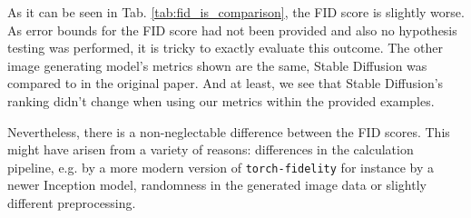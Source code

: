 \documentclass[11pt]{article}
\begin{document}
As it can be seen in Tab. \ref{tab:fid_is_comparison}, the FID score is slightly worse. As error bounds for the FID score had not been provided and also no hypothesis testing was performed, it is tricky to exactly evaluate this outcome. The other image generating model's metrics shown are the same, Stable Diffusion was compared to in the original paper. And at least, we see that Stable Diffusion's ranking didn't change when using our metrics within the provided examples.

Nevertheless, there is a non-neglectable difference between the FID scores. This might have arisen from a variety of reasons: differences in the calculation pipeline, e.g. by a more modern version of \texttt{torch-fidelity} for instance by a newer Inception model, randomness in the generated image data or slightly different preprocessing.
\end{document}
